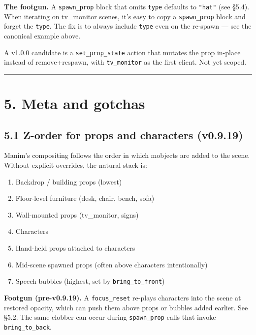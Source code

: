 \documentclass[
  11pt,
]{book}
\providecommand{\tightlist}{%
  \setlength{\itemsep}{0pt}\setlength{\parskip}{0pt}}
\begin{document}
\textbf{The footgun.} A \texttt{spawn\_prop} block that omits
\texttt{type} defaults to \texttt{"hat"} (see §5.4). When iterating on
tv\_monitor scenes, it's easy to copy a \texttt{spawn\_prop} block and
forget the \texttt{type}. The fix is to always include \texttt{type}
even on the re-spawn --- see the canonical example above.

A v1.0.0 candidate is a \texttt{set\_prop\_state} action that mutates
the prop in-place instead of remove+respawn, with \texttt{tv\_monitor}
as the first client. Not yet scoped.

\begin{center}\rule{0.5\linewidth}{0.5pt}\end{center}

\section{5. Meta and gotchas}\label{meta-and-gotchas}

\subsection{5.1 Z-order for props and characters (v0.9.19)}\label{z-order-for-props}

Manim's compositing follows the order in which mobjects are added to the
scene. Without explicit overrides, the natural stack is:

\begin{enumerate}
\def\labelenumi{\arabic{enumi}.}
\tightlist
\item
  Backdrop / building props (lowest)
\item
  Floor-level furniture (desk, chair, bench, sofa)
\item
  Wall-mounted props (tv\_monitor, signs)
\item
  Characters
\item
  Hand-held props attached to characters
\item
  Mid-scene spawned props (often above characters intentionally)
\item
  Speech bubbles (highest, set by \texttt{bring\_to\_front})
\end{enumerate}

\textbf{Footgun (pre-v0.9.19).} A \texttt{focus\_reset} re-plays
characters into the scene at restored opacity, which can push them above
props or bubbles added earlier. See §5.2. The same clobber can occur
during \texttt{spawn\_prop} calls that invoke \texttt{bring\_to\_back}.
\end{document}
